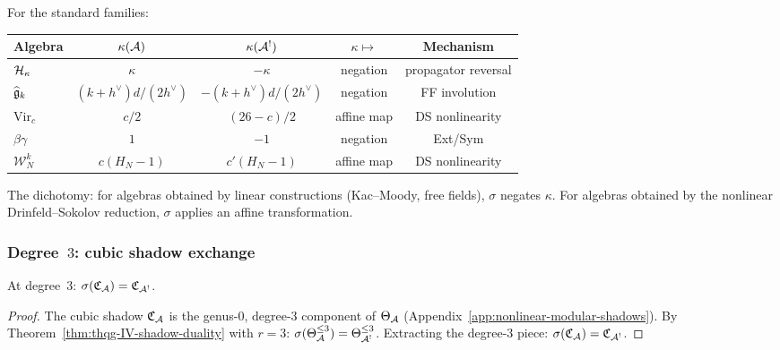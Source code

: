 \begin{computation}
\label{comp:thqg-IV-curvature-exchange}
For the standard families:
\begin{center}
\renewcommand{\arraystretch}{1.3}
\begin{tabular}{lcccc}
\toprule
\textbf{Algebra} & $\kappa(\mathcal{A})$ & $\kappa(\mathcal{A}^!)$ &
$\kappa \mapsto$ & Mechanism \\
\midrule
$\mathcal{H}_\kappa$ & $\kappa$ & $-\kappa$ & negation & propagator reversal \\
$\widehat{\mathfrak{g}}_k$ & $(k{+}h^\vee)d/(2h^\vee)$ &
$-(k{+}h^\vee)d/(2h^\vee)$ & negation & FF involution \\
$\mathrm{Vir}_c$ & $c/2$ & $(26{-}c)/2$ & affine map &
DS nonlinearity \\
$\beta\gamma$ & $1$ & $-1$ & negation & Ext/Sym \\
$\mathcal{W}_N^k$ & $c(H_N{-}1)$ & $c'(H_N{-}1)$ & affine map &
DS nonlinearity \\
\bottomrule
\end{tabular}
\end{center}
The dichotomy: for algebras obtained by linear constructions
(Kac--Moody, free fields), $\sigma$ negates $\kappa$. For algebras
obtained by the nonlinear Drinfeld--Sokolov reduction, $\sigma$ applies
an affine transformation.
\end{computation}

\subsubsection{Degree~$3$: cubic shadow exchange}

\begin{proposition}
\label{prop:thqg-IV-cubic-duality}
At degree~$3$:
$\sigma(\mathfrak{C}_{\mathcal{A}}) = \mathfrak{C}_{\mathcal{A}^!}$.
\end{proposition}

\begin{proof}
The cubic shadow $\mathfrak{C}_{\mathcal{A}}$ is the genus-$0$, degree-$3$
component of $\Theta_{\mathcal{A}}$ (Appendix~\ref{app:nonlinear-modular-shadows}).
By Theorem~\ref{thm:thqg-IV-shadow-duality} with $r = 3$:
$\sigma(\Theta_{\mathcal{A}}^{\leq 3}) = \Theta_{\mathcal{A}^!}^{\leq 3}$.
Extracting the degree-$3$ piece:
$\sigma(\mathfrak{C}_{\mathcal{A}}) = \mathfrak{C}_{\mathcal{A}^!}$.
\end{proof}

